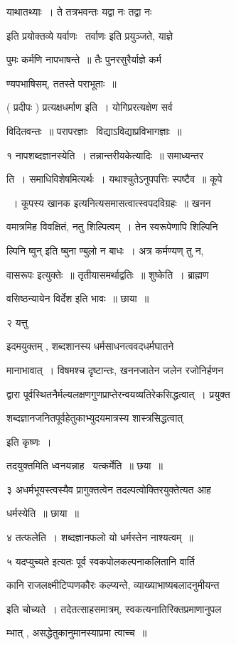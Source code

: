 \documentclass[11pt, openany]{book}
\begin{document}
याथातथ्याः~। ते तत्रभवन्तः {\qt यद्वा नः तद्वा नः}

इति प्रयोक्तव्ये यर्वाणः \textendash\ तर्वाणः इति प्रयुञ्जते, याज्ञे 

पुमः कर्मणि नापभाषन्ते~॥ तैः पुनरसुरैर्याज्ञे कर्म \textendash\ 

ण्यपभाषिसम्, ततस्ते पराभूताः~॥ 

( प्रदीपः ) प्रत्यक्षधर्माण इति~। योगिप्ररत्यक्षेण सर्व 

विदितवन्तः~॥ परापरज्ञाः \textendash\ विद्याऽविद्याप्रविभागज्ञाः~॥ 

१ नापशब्दज्ञानस्येति~। तन्नान्तरीयकेत्यादिः~॥ समाध्यन्तर \textendash\ 

ति~। समाधिविशेषमित्यर्थः~। यथाश्चुतेऽनुपपत्तिः स्पष्टैव~॥ कूपे \textendash\ 

~। कूपस्य खानक इत्यनित्यसमासत्वात्स्वपदविग्रहः~॥ खनन \textendash\ 

वमात्रमिह विवक्षितं, नतु शिल्पित्वम्~। तेन स्वरूपेणापि शिल्पिनि 

ल्पिनि ष्वुन् इति ष्बुना ण्बुलो न बाधः~। अत्र कर्मण्यण् तु न, 

{\qt वासरूपः} इत्युक्तेः~॥ तृतीयासमर्थाद्वतिः~॥ शुष्केति~। ब्राह्मण \textendash\ 

वसिष्ठन्यायेन विर्देश इति भावः~॥ छाया~॥ 

२ यत्तु \textendash\ {\qt इदमयुक्तम् , शब्दशानस्य धर्मसाधनत्ववदधर्मघातने 

मानाभावात्~। विषमश्च दृष्टान्तः, खननजातेन जलेन रजोनिर्हणन \textendash\ 

द्वारा पूर्वस्थितनैर्मल्यलक्षणगुणप्राप्तेरन्वयव्यतिरेकसिद्धत्वात्~। 
प्रयुक्त \textendash\ 

शब्दज्ञानजनितपूर्वहेतुकाभ्युदयमात्रस्य शास्त्रसिद्धत्वात्} इति कृष्णः~। 


तदयुक्तमिति ध्वनयन्नाह \textendash\ यत्कर्मेति~॥ छया~॥ 

३ अधर्मभूयस्त्वस्यैव प्रागुक्तत्वेन तदल्पत्वोक्तिरयुक्तेत्यत आह \textendash\ 

धर्मस्येति~॥ छाया~॥ 

४ तत्फलेति~। शब्दज्ञानफलो यो धर्मस्तेन नाश्यत्वम्~॥ 

५ {\qt यदप्युच्यते} इत्यतः पूर्व स्वकपोलकल्पनाकलितानि वार्ति \textendash\ 

कानि राजलक्ष्मीटिप्पणकौरः कल्प्यन्ते, व्याख्याभाष्यबलादनुमीयन्त 

इति चोच्यते~। तदेतत्साहसमात्रम्, स्वकत्यनातिरिक्तप्रमाणानुपल \textendash\ 

म्भात् , असद्धेतुकानुमानस्याप्रमा त्वाच्च~॥ 
\end{document}

